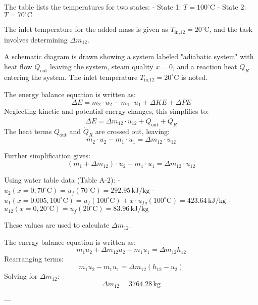 The table lists the temperatures for two states:  
- State 1: \( T = 100^\circ\text{C} \)  
- State 2: \( T = 70^\circ\text{C} \)  

The inlet temperature for the added mass is given as \( T_{\text{in,12}} = 20^\circ\text{C} \), and the task involves determining \( \Delta m_{12} \).  

A schematic diagram is drawn showing a system labeled "adiabatic system" with heat flow \( Q_{\text{out}} \) leaving the system, steam quality \( x = 0 \), and a reaction heat \( \dot{Q}_R \) entering the system. The inlet temperature \( T_{\text{in,12}} = 20^\circ\text{C} \) is noted.  

The energy balance equation is written as:  
\[
\Delta E = m_2 \cdot u_2 - m_1 \cdot u_1 + \Delta KE + \Delta PE  
\]  
Neglecting kinetic and potential energy changes, this simplifies to:  
\[
\Delta E = \Delta m_{12} \cdot u_{12} + Q_{\text{out}} + \dot{Q}_R  
\]  
The heat terms \( Q_{\text{out}} \) and \( \dot{Q}_R \) are crossed out, leaving:  
\[
m_2 \cdot u_2 - m_1 \cdot u_1 = \Delta m_{12} \cdot u_{12}  
\]  

Further simplification gives:  
\[
(m_1 + \Delta m_{12}) \cdot u_2 - m_1 \cdot u_1 = \Delta m_{12} \cdot u_{12}  
\]  

Using water table data (Table A-2):  
- \( u_2(x = 0, 70^\circ\text{C}) = u_f(70^\circ\text{C}) = 292.95 \, \text{kJ/kg} \)  
- \( u_1(x = 0.005, 100^\circ\text{C}) = u_f(100^\circ\text{C}) + x \cdot u_{fg}(100^\circ\text{C}) = 423.64 \, \text{kJ/kg} \)  
- \( u_{12}(x = 0, 20^\circ\text{C}) = u_f(20^\circ\text{C}) = 83.96 \, \text{kJ/kg} \)  

These values are used to calculate \( \Delta m_{12} \).

The energy balance equation is written as:  
\[
m_1 u_2 + \Delta m_{12} u_2 - m_1 u_1 = \Delta m_{12} h_{12}
\]  
Rearranging terms:  
\[
m_1 u_2 - m_1 u_1 = \Delta m_{12} (h_{12} - u_2)
\]  
Solving for \( \Delta m_{12} \):  
\[
\Delta m_{12} = 3764.28 \, \text{kg}
\]  

---